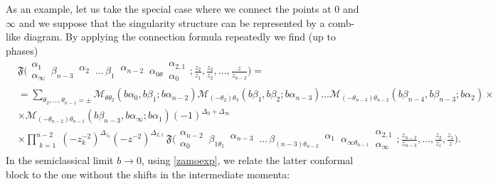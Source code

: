 \documentclass[11pt]{article}
\numberwithin{equation}{section}
\newcommand{\Fn}[8]{\mathfrak{F}\bigg( \begin{matrix} #2 \\ #1 \end{matrix} \, #3 \, \begin{matrix} #4  \\ \, \end{matrix} \,#5 \, #6\,\begin{matrix} #7 \\  \, \end{matrix} \, #8 \, }
\begin{document}
As an example, let us take the special case where we connect the points at $0$ and $\infty$ and we suppose that the singularity structure can be represented by a comb-like diagram. By applying  the connection formula repeatedly
we find (up to phases)
\begin{equation}\label{eq:connex}
\begin{aligned}
&\Fn{\alpha_{\infty}}{\alpha_{{1}}}{\beta_{n-3}}{\alpha_{{2}}}{\dots}{\beta_1}{\alpha_{n-2}}{\alpha_{0\theta}}\begin{matrix} \alpha_{2,1} \\ \alpha_0\end{matrix};\frac{z_{2}}{z_{1}},\frac{z_{3}}{z_{2}},\dots,\frac{z}{z_{n-2}}\bigg)=\\
&=\sum_{\theta_2,\dots,\theta_{n-1}=\pm}\mathcal{M}_{\theta\theta_2}\left(b\alpha_0,b\beta_1;b\alpha_{n-2}\right)\mathcal{M}_{(-\theta_2)\theta_3}\left(b\beta_1,b\beta_2;b\alpha_{n-3}\right)\dots\mathcal{M}_{(-\theta_{n-3})\theta_{n-2}}\left(b\beta_{n-4},b\beta_{n-3};b\alpha_{{2}}\right)\times\\
&\times\mathcal{M}_{(-\theta_{n-2})\theta_{n-1}}\left(b\beta_{n-3},b\alpha_{\infty};b\alpha_{{1}}\right) (-1)^{\Delta_0+\Delta_\infty}\, \\
&\times\prod_{\substack{k=1 }}^{n-2} (-z_k^{-2})^{\Delta_{z_k}}(-z^{-2})^{\Delta_{2,1}}\,\Fn{\alpha_{0}}{\alpha_{n-2}}{\beta_{1\theta_2}}{\alpha_{{n-3}}}{\dots}{\beta_{(n-3)\theta_{n-2}}}{\alpha_{{1}}}{\alpha_{\infty\theta_{n-1}}}\begin{matrix} \alpha_{2,1} \\ \alpha_{\infty}\end{matrix};\frac{z_{n-2}}{z_{n-3}},\dots,\frac{z_{2}}{z_1},\frac{z_{1}}{z}\bigg).
\end{aligned}
\end{equation}
%
In the semiclassical limit $b\to 0$, using \eqref{zamoexp}, we relate the latter conformal block to the one without the shifts in the intermediate momenta: 
\end{document}
